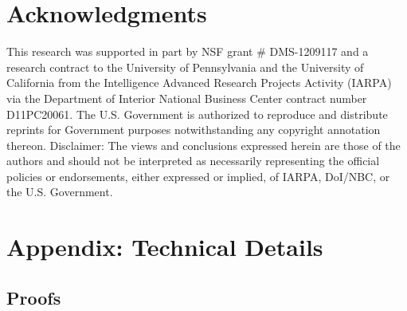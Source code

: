 \documentclass[11pt]{article}
\theoremstyle{definition}
\theoremstyle{definition}
\begin{document}
\section*{Acknowledgments} 
This research was supported in part by NSF grant \# DMS-1209117 and a research contract to the University
of Pennsylvania and the University of California from the Intelligence
Advanced Research Projects Activity (IARPA) via the Department of
Interior National Business Center contract number D11PC20061. The
U.S. Government is authorized to reproduce and distribute reprints for
Government purposes notwithstanding any copyright annotation
thereon. Disclaimer: The views and conclusions expressed herein are
those of the authors and should not be interpreted as necessarily
representing the official policies or endorsements, either expressed
or implied, of IARPA, DoI/NBC, or the U.S. Government.


\appendix 
\section*{Appendix: Technical Details}
\label{appendix}

\renewcommand{\thesubsection}{\Alph{subsection}}

\subsection{Proofs}
\end{document}
